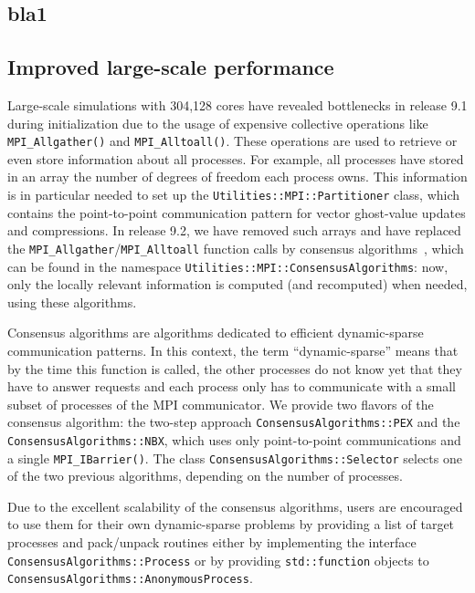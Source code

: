 \documentclass{ansarticle-preprint}
\begin{document}
\subsection{bla1}
\label{subsec:bla1}


\subsection{Improved large-scale performance}
\label{subsec:performance}

Large-scale simulations with 304,128 cores have revealed bottlenecks in release 
9.1 during initialization due to the usage of expensive collective operations 
like \texttt{MPI\_Allgather()} and \texttt{MPI\_\allowbreak Alltoall()}. These 
operations are used to retrieve or even store information about all processes. 
For example, all processes have stored in  an array the number of degrees of 
freedom each process owns. This information is in particular needed to set up 
the  \texttt{Utilities::MPI::Partitioner} class, which contains the 
point-to-point communication pattern for vector ghost-value updates and 
compressions. In release 9.2, we have removed such arrays and have replaced 
the \texttt{MPI\_Allgather}/\allowbreak\texttt{MPI\_\allowbreak Alltoall} 
function calls by consensus algorithms~\cite{hoefler2010scalable}, which can be 
found in the namespace \texttt{Utilities::\allowbreak MPI::\allowbreak ConsensusAlgorithms}: now, only the locally relevant information is computed 
(and recomputed) when needed, using these algorithms. 

Consensus algorithms are algorithms dedicated to efficient dynamic-sparse 
communication patterns. In this context, the term ``dynamic-sparse'' means 
that by the time this function is called, the other processes do not know 
yet that they have to answer requests and
each process only has to communicate with a small subset of processes of the 
MPI communicator. We provide two flavors of the consensus algorithm: the two-step 
approach \texttt{ConsensusAlgorithms::PEX} and the \texttt{ConsensusAlgorithms::NBX}, 
which uses only point-to-point communications and a single \texttt{MPI\_IBarrier()}. 
The class \texttt{ConsensusAlgorithms::Selector} selects one of the two previous 
algorithms, depending on the number of processes.

Due to the excellent scalability of the consensus algorithms, users are encouraged 
to use them for their own dynamic-sparse problems by providing a list of target 
processes and pack/unpack routines either by implementing the interface 
\texttt{ConsensusAlgorithms::Process} or by providing \texttt{std::function} 
objects to \texttt{ConsensusAlgorithms::AnonymousProcess}.
\end{document}

